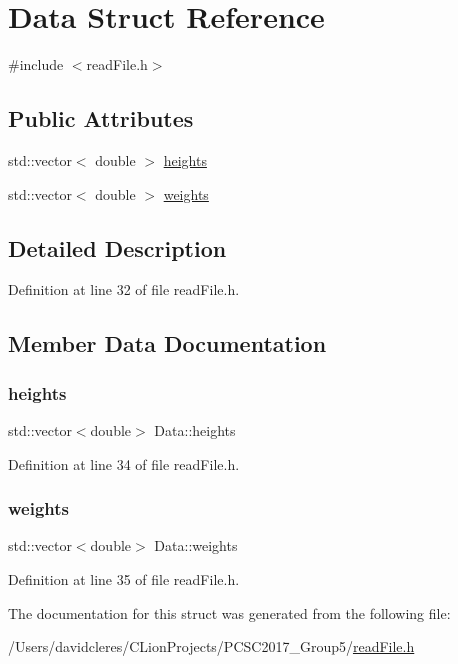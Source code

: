 \hypertarget{struct_data}{}\section{Data Struct Reference}
\label{struct_data}


{\ttfamily \#include $<$read\+File.\+h$>$}

\subsection*{Public Attributes}
\begin{DoxyCompactItemize}
\item 
std\+::vector$<$ double $>$ \mbox{\hyperlink{struct_data_af8859b12fd48d0b1f8136b82a54f269e}{heights}}
\item 
std\+::vector$<$ double $>$ \mbox{\hyperlink{struct_data_a240f15bb7792f4b6326f760f2a5020cd}{weights}}
\end{DoxyCompactItemize}


\subsection{Detailed Description}


Definition at line 32 of file read\+File.\+h.



\subsection{Member Data Documentation}
\mbox{\label{struct_data_af8859b12fd48d0b1f8136b82a54f269e}} 
\subsubsection{\texorpdfstring{heights}{heights}}
{\footnotesize\ttfamily std\+::vector$<$double$>$ Data\+::heights}



Definition at line 34 of file read\+File.\+h.

\mbox{\label{struct_data_a240f15bb7792f4b6326f760f2a5020cd}} 
\subsubsection{\texorpdfstring{weights}{weights}}
{\footnotesize\ttfamily std\+::vector$<$double$>$ Data\+::weights}



Definition at line 35 of file read\+File.\+h.



The documentation for this struct was generated from the following file\+:\begin{DoxyCompactItemize}
\item 
/\+Users/davidcleres/\+C\+Lion\+Projects/\+P\+C\+S\+C2017\+\_\+\+Group5/\mbox{\hyperlink{read_file_8h}{read\+File.\+h}}\end{DoxyCompactItemize}
